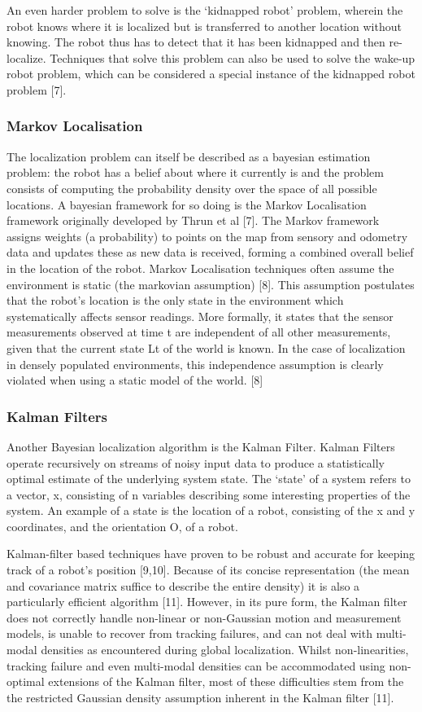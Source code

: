 \documentclass{article}
\begin{document}
An even harder problem to solve is the ‘kidnapped robot’ problem, wherein the robot  knows where it is localized but is transferred to another location without knowing. The robot thus has to detect that it has been kidnapped and then re-localize. Techniques that solve this problem can also be used to solve the wake-up robot problem, which can be considered a special instance of the kidnapped robot problem [7].

	\subsubsection{Markov Localisation}
	The localization problem can itself be described as a bayesian estimation problem: the robot has a belief about where it currently is and the problem consists of computing the probability density over the space of all possible locations. A bayesian framework for so doing is the Markov Localisation framework originally developed by Thrun et al [7]. The Markov framework assigns weights (a probability) to points on the map from sensory and odometry data and updates these as new data is received, forming a combined overall belief in the location of the robot. Markov Localisation techniques often assume the environment is static (the markovian assumption) [8]. This assumption postulates that the robot's location is the only state in the environment which systematically affects sensor readings. More formally, it states that the sensor measurements observed at time t are independent of all other measurements, given that the current state Lt of the world is known. In the case of localization in densely populated environments, this independence assumption is clearly violated when using a static model of the world. [8]

	\subsubsection{Kalman Filters}
	Another Bayesian localization algorithm is the Kalman Filter. Kalman Filters operate recursively on streams of noisy input data to produce a statistically optimal estimate of the underlying system state. The ‘state’ of a system refers to a vector, x, consisting of n variables describing some interesting properties of the system. An example of a state is the location of a robot, consisting of the x and y coordinates, and the orientation O, of a robot.

	Kalman-filter based techniques have proven to be robust and accurate for keeping track of a robot’s position [9,10]. Because of its concise representation (the mean and covariance matrix suffice to describe the entire density) it is also a particularly efficient algorithm [11]. However, in its pure form, the Kalman filter does not correctly handle non-linear or non-Gaussian motion and measurement models, is unable to recover from tracking failures, and can not deal with multi-modal densities as encountered during global localization. Whilst non-linearities, tracking failure and even multi-modal densities can be accommodated using non-optimal extensions of the Kalman filter, most of these difficulties stem from the the restricted Gaussian density assumption inherent in the Kalman filter [11].
\end{document}
